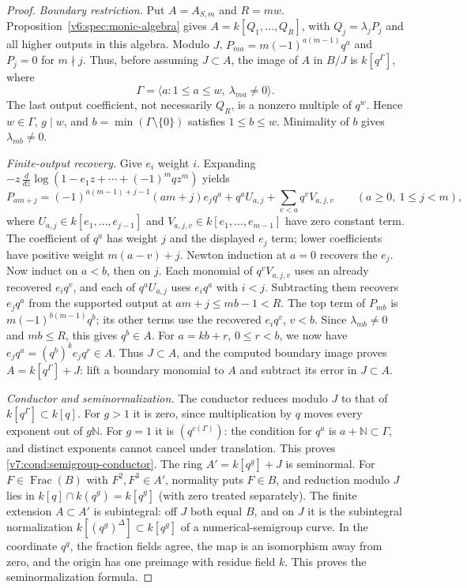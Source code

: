 \documentclass[10pt,fleqn]{article}
\numberwithin{equation}{section}
\begin{document}
\begin{proof}
\emph{Boundary restriction.}
Put $A=A_{S,m}$ and $R=mw$.  Proposition~\ref{v6:spec:monic-algebra}
gives $A=k[Q_1,\ldots,Q_R]$, with $Q_j=\lambda_jP_j$ and all higher
outputs in this algebra.  Modulo $J$,
$P_{ma}=m(-1)^{a(m-1)}q^a$ and $P_j=0$ for $m\nmid j$.  Thus, before
assuming $J\subset A$, the image of $A$ in $B/J$ is $k[q^\Gamma]$, where
\[
 \Gamma=\langle a:1\le a\le w,\ \lambda_{ma}\ne0\rangle.
\]
The last output coefficient, not necessarily $Q_R$, is a nonzero
multiple of $q^w$.  Hence $w\in\Gamma$, $g\mid w$, and
$b=\min(\Gamma\setminus\{0\})$ satisfies $1\le b\le w$.
Minimality of $b$ gives $\lambda_{mb}\ne0$.

\emph{Finite-output recovery.}
Give $e_i$ weight $i$.  Expanding
$-z\,\frac{d}{dz}\log(1-e_1z+\cdots+(-1)^mqz^m)$ yields
\[
 P_{am+j}=(-1)^{a(m-1)+j-1}(am+j)e_jq^a
       +q^aU_{a,j}+\sum_{v<a}q^vV_{a,j,v}
 \qquad(a\ge0,\ 1\le j<m),
\]
where $U_{a,j}\in k[e_1,\ldots,e_{j-1}]$ and
$V_{a,j,v}\in k[e_1,\ldots,e_{m-1}]$ have zero constant term.
The coefficient of $q^a$ has weight $j$ and the displayed $e_j$ term;
lower coefficients have positive weight $m(a-v)+j$.
Newton induction at $a=0$ recovers the $e_j$.  Now induct on $a<b$,
then on $j$.  Each monomial of $q^vV_{a,j,v}$ uses an already recovered
$e_iq^v$, and each of $q^aU_{a,j}$ uses $e_iq^a$ with $i<j$.
Subtracting them recovers $e_jq^a$ from the supported output at
$am+j\le mb-1<R$.  The top term of $P_{mb}$ is
$m(-1)^{b(m-1)}q^b$; its other terms use the recovered $e_iq^v$, $v<b$.
Since $\lambda_{mb}\ne0$ and $mb\le R$, this gives $q^b\in A$.
For $a=kb+r$, $0\le r<b$, we now have
$e_jq^a=(q^b)^ke_jq^r\in A$.  Thus $J\subset A$, and the computed
boundary image proves
$A=k[q^\Gamma]+J$: lift a boundary monomial to $A$ and subtract its
error in $J\subset A$.

\emph{Conductor and seminormalization.}
The conductor reduces modulo $J$ to that of $k[q^\Gamma]\subset k[q]$.
For $g>1$ it is zero, since multiplication by $q$ moves every exponent
out of $g\mathbb N$.  For $g=1$ it is $(q^{c(\Gamma)})$: the condition
for $q^a$ is $a+\mathbb N\subset\Gamma$, and distinct exponents cannot
cancel under translation.  This proves \eqref{v7:cond:semigroup-conductor}.
The ring $A'=k[q^g]+J$ is seminormal.  For $F\in\operatorname{Frac}(B)$
with $F^2,F^3\in A'$, normality puts $F\in B$, and reduction modulo $J$ lies in
$k[q]\cap k(q^g)=k[q^g]$ (with zero treated separately).
The finite extension $A\subset A'$ is subintegral: off $J$ both equal
$B$, and on $J$ it is the subintegral normalization
$k[(q^g)^\Delta]\subset k[q^g]$ of a numerical-semigroup curve.
In the coordinate $q^g$, the fraction fields agree, the map is an
isomorphism away from zero, and the origin has one preimage with residue
field $k$.  This proves the seminormalization formula.


\end{proof}
\end{document}
